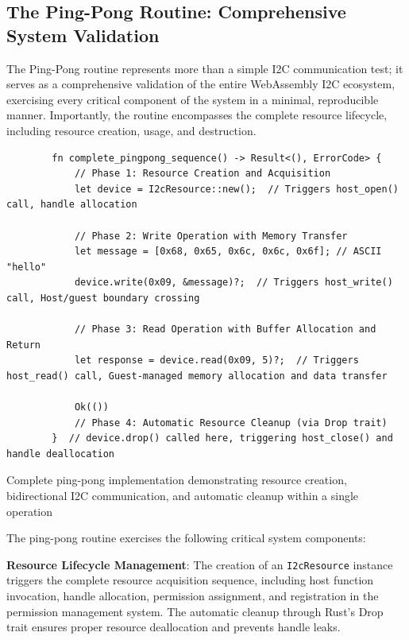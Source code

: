 \subsection{The Ping-Pong Routine: Comprehensive System Validation}
\label{subsec:ping-pong-routine}

The Ping-Pong routine represents more than a simple I2C communication test; it serves as a comprehensive validation of the entire WebAssembly I2C ecosystem, exercising every critical component of the system in a minimal, reproducible manner. Importantly, the routine encompasses the complete resource lifecycle, including resource creation, usage, and destruction.

\begin{listing}[H]
    \begin{verbatim}
        fn complete_pingpong_sequence() -> Result<(), ErrorCode> {
            // Phase 1: Resource Creation and Acquisition
            let device = I2cResource::new();  // Triggers host_open() call, handle allocation
            
            // Phase 2: Write Operation with Memory Transfer
            let message = [0x68, 0x65, 0x6c, 0x6c, 0x6f]; // ASCII "hello"
            device.write(0x09, &message)?;  // Triggers host_write() call, Host/guest boundary crossing
            
            // Phase 3: Read Operation with Buffer Allocation and Return
            let response = device.read(0x09, 5)?;  // Triggers host_read() call, Guest-managed memory allocation and data transfer
            
            Ok(())
            // Phase 4: Automatic Resource Cleanup (via Drop trait)
        }  // device.drop() called here, triggering host_close() and handle deallocation
    \end{verbatim}
    \caption{Complete ping-pong implementation demonstrating resource creation, bidirectional I2C communication, and automatic cleanup within a single operation}
    \label{lst:complete-pingpong}
\end{listing}

The ping-pong routine exercises the following critical system components:

\textbf{Resource Lifecycle Management}: The creation of an \texttt{I2cResource} instance triggers the complete resource acquisition sequence, including host function invocation, handle allocation, permission assignment, and registration in the permission management system. The automatic cleanup through Rust's Drop trait ensures proper resource deallocation and prevents handle leaks.

